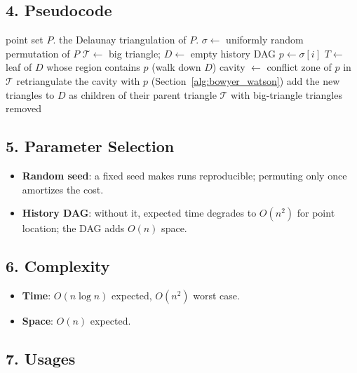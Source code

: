 \subsection{4. Pseudocode}

\begin{algorithm}[htbp]
\caption{Randomized Incremental Delaunay}
\label{alg:randomized_delaunay}
\begin{algorithmic}[1]
\Require point set $P$.
\Ensure the Delaunay triangulation of $P$.
  \State $\sigma \gets $ uniformly random permutation of $P$
  \State $\mathcal{T} \gets $ big triangle; $D \gets $ empty history DAG
    \State $p \gets \sigma[i]$
    \State $T \gets $ leaf of $D$ whose region contains $p$ (walk down $D$)
    \State cavity $\gets$ conflict zone of $p$ in $\mathcal{T}$
    \State retriangulate the cavity with $p$ (Section~\ref{alg:bowyer_watson})
    \State add the new triangles to $D$ as children of their parent triangle
  \EndFor
  \State \Return $\mathcal{T}$ with big-triangle triangles removed
\EndFunction
\end{algorithmic}
\end{algorithm}

\subsection{5. Parameter Selection}

\begin{itemize}
\item \textbf{Random seed}: a fixed seed makes runs reproducible; permuting
  only once amortizes the cost.
\item \textbf{History DAG}: without it, expected time degrades to $O(n^2)$ for
  point location; the DAG adds $O(n)$ space.
\end{itemize}

\subsection{6. Complexity}

\begin{itemize}
\item \textbf{Time}: $O(n \log n)$ expected, $O(n^2)$ worst case.
\item \textbf{Space}: $O(n)$ expected.
\end{itemize}

\subsection{7. Usages}

